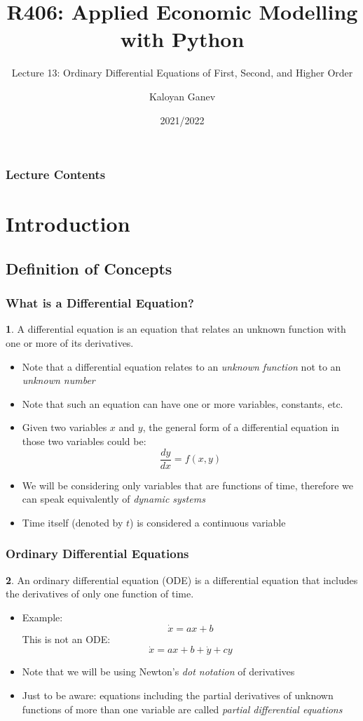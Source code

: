 \documentclass[10pt,usenames,dvipsnames]{beamer}
\title{R406: Applied Economic Modelling with Python}
\subtitle{Lecture 13: \textcolor{myred}{Ordinary Differential Equations of First, Second, and Higher Order}}
\author{Kaloyan Ganev}
\date{2021/2022}
\theoremstyle{definition}
\newtheorem{definition}{\translate{Definition}}
\begin{document}
\maketitle

\begin{frame}[fragile]
\frametitle{Lecture Contents}
\tableofcontents
\end{frame}

\section{Introduction}
\subsection{Definition of Concepts}
\begin{frame}[fragile]
\frametitle{What is a Differential Equation?}
\begin{definition}
	A differential equation is an equation that relates an unknown function with one or more of its derivatives.
\end{definition}
\begin{itemize}
	\item Note that a differential equation relates to an \textit{unknown function} not to an \textit{unknown number}
	\item Note that such an equation can have one or more variables, constants, etc.
	\item Given two variables $x$ and $y$, the general form of a differential equation in those two variables could be:
	\[
		\dfrac{dy}{dx} = f(x,y)
	\]
	\item We will be considering only variables that are functions of time, therefore we can speak equivalently of \textit{dynamic systems}
	\item Time itself (denoted by $t$) is considered a continuous variable
\end{itemize}
\end{frame}

\begin{frame}[fragile]
\frametitle{Ordinary Differential Equations}
\begin{definition}
	An ordinary differential equation (ODE) is a differential equation that includes the derivatives of only one function of time.
\end{definition}
\begin{itemize}
	\item Example:
	\[
		\dot{x} = ax + b
	\]
	This is not an ODE:
	\[
		\dot{x} = ax + b + \dot{y} + cy
	\]
	\item Note that we will be using Newton's \textit{dot notation} of derivatives
	\item Just to be aware: equations including the partial derivatives of unknown functions of more than one variable are called \textit{partial differential equations}
\end{itemize}
\end{frame}
\end{document}
